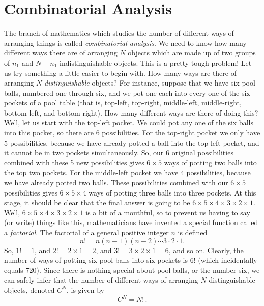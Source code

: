 \section{Combinatorial Analysis}
The branch of mathematics which studies the number of different ways of
arranging things is called {\em combinatorial analysis}. We need to know
how many different ways there are of arranging $N$ objects which are made up
of  two groups of $n_1$ and $N-n_1$ indistinguishable objects. This is a
pretty tough problem! Let us try something a little easier to begin with.
How many ways are there of arranging $N$ {\em distinguishable}
objects? For instance, suppose that we have six pool balls, numbered one 
through six, and we pot one each into every one of 
the six pockets of a pool table (that is, top-left, top-right, middle-left,
middle-right, bottom-left, and bottom-right). How many different ways
are there of doing this? Well, let us start with the top-left pocket.
We could pot any one of the six balls into this pocket, so there are
6 possibilities. For the top-right pocket we only have 5 possibilities,
because we have already potted a ball into the top-left pocket, and it
cannot be in two pockets simultaneously. So, our 6 original possibilities 
combined with these 5 new possibilities gives $6\times 5$ ways of potting
two balls into the top two pockets. For the middle-left pocket we have
4 possibilities, because we have already potted two balls. These possibilities
combined with our $6\times 5$ possibilities gives $6\times 5\times 4$ ways
of potting three balls into three pockets. 
At this stage, it should be clear that
the final answer is going to be $6\times 5\times 4 \times 3 \times 2 \times 1$.
Well, $6\times 5 \times 4 \times 3 \times 2 \times 1$ is a bit of a mouthful,
so to prevent us having to say (or write)  things like this, mathematicians have invented
a special function called a {\em factorial}. The factorial of a general
 positive
integer $n$ is defined
\begin{equation}
n! = n(n-1)(n-2) \cdots 3\cdot 2 \cdot 1.
\end{equation}
So, $1! = 1$,  and
$2! = 2\times 1 = 2$, and $3!= 3\times 2 \times 1 = 6$, and so on. Clearly, the
number of ways of potting six pool balls into six pockets is $6!$ (which
incidentally equals 720). Since there is nothing special about pool balls, or 
the number six, we can safely infer that the number of different ways of
arranging $N$ distinguishable objects, denoted $C^N$, is given by
\begin{equation}
C^N = N!\, .
\end{equation}

